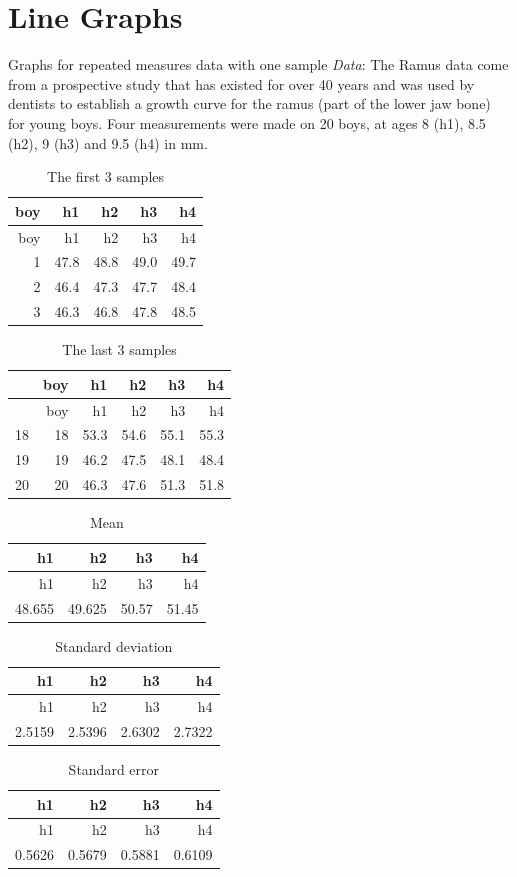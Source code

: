 \documentclass[
  9pt,
  ignorenonframetext,
]{beamer}
\begin{document}
\hypertarget{line-graphs}{%
\section{Line Graphs}\label{line-graphs}}

\begin{frame}{Graphs for repeated measures data with one sample}
\protect\hypertarget{graphs-for-repeated-measures-data-with-one-sample}{}
\emph{Data}: The Ramus data come from a prospective study that has
existed for over 40 years and was used by dentists to establish a growth
curve for the ramus (part of the lower jaw bone) for young boys. Four
measurements were made on 20 boys, at ages 8 (h1), 8.5 (h2), 9 (h3) and
9.5 (h4) in mm.

\tiny

\begin{longtable}[]{@{}rrrrr@{}}
\caption{The first 3 samples}\tabularnewline
\toprule
boy & h1 & h2 & h3 & h4\tabularnewline
\midrule
\endfirsthead
\toprule
boy & h1 & h2 & h3 & h4\tabularnewline
\midrule
\endhead
1 & 47.8 & 48.8 & 49.0 & 49.7\tabularnewline
2 & 46.4 & 47.3 & 47.7 & 48.4\tabularnewline
3 & 46.3 & 46.8 & 47.8 & 48.5\tabularnewline
\bottomrule
\end{longtable}

\begin{longtable}[]{@{}lrrrrr@{}}
\caption{The last 3 samples}\tabularnewline
\toprule
& boy & h1 & h2 & h3 & h4\tabularnewline
\midrule
\endfirsthead
\toprule
& boy & h1 & h2 & h3 & h4\tabularnewline
\midrule
\endhead
18 & 18 & 53.3 & 54.6 & 55.1 & 55.3\tabularnewline
19 & 19 & 46.2 & 47.5 & 48.1 & 48.4\tabularnewline
20 & 20 & 46.3 & 47.6 & 51.3 & 51.8\tabularnewline
\bottomrule
\end{longtable}

\tiny
\end{frame}

\begin{frame}{}
\protect\hypertarget{section}{}
\tiny

\begin{longtable}[]{@{}rrrr@{}}
\caption{Mean}\tabularnewline
\toprule
h1 & h2 & h3 & h4\tabularnewline
\midrule
\endfirsthead
\toprule
h1 & h2 & h3 & h4\tabularnewline
\midrule
\endhead
48.655 & 49.625 & 50.57 & 51.45\tabularnewline
\bottomrule
\end{longtable}

\begin{longtable}[]{@{}rrrr@{}}
\caption{Standard deviation}\tabularnewline
\toprule
h1 & h2 & h3 & h4\tabularnewline
\midrule
\endfirsthead
\toprule
h1 & h2 & h3 & h4\tabularnewline
\midrule
\endhead
2.5159 & 2.5396 & 2.6302 & 2.7322\tabularnewline
\bottomrule
\end{longtable}

\begin{longtable}[]{@{}rrrr@{}}
\caption{Standard error}\tabularnewline
\toprule
h1 & h2 & h3 & h4\tabularnewline
\midrule
\endfirsthead
\toprule
h1 & h2 & h3 & h4\tabularnewline
\midrule
\endhead
0.5626 & 0.5679 & 0.5881 & 0.6109\tabularnewline
\bottomrule
\end{longtable}

\tiny
\end{frame}
\end{document}
